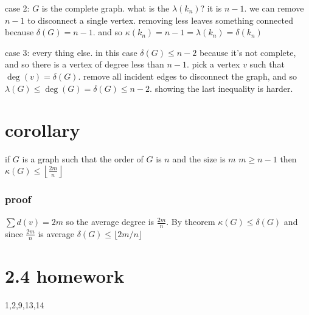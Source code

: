 \documentclass[letterpaper]{article}
\begin{document}
case 2: $G$ is the complete graph. what is the $\lambda(k_n)$? it is $n-1$. we can remove $n-1$ to disconnect a single vertex. removing less leaves something connected because $\delta(G)=n-1$. and so $\kappa(k_n)=n-1=\lambda(k_n)=\delta(k_n)$

case 3: every thing else. in this case $\delta(G)\le n-2$ because it's not complete, and so there is a vertex of degree less than $n-1$. pick a vertex $v$ such that $\deg(v)=\delta(G)$. remove all incident edges to disconnect the graph, and so $\lambda(G)\le\deg(G)=\delta(G)\le n-2$. showing the last inequality is harder.

\section*{corollary}
if $G$ is a graph such that the order of $G$ is $n$ and the size is $m$ $m\ge n-1$ then $\kappa(G)\le \left\lfloor\frac{2m}{n}\right\rfloor$
\subsubsection*{proof}
$\sum\limits{d(v)}=2m$ so the average degree is $\frac{2m}{n}$. By theorem $\kappa(G)\le\delta(G)$ and since $\frac{2m}{n}$ is average $\delta(G)\le\lfloor 2m/n\rfloor$

\section*{2.4 homework}
1,2,9,13,14
\end{document}
